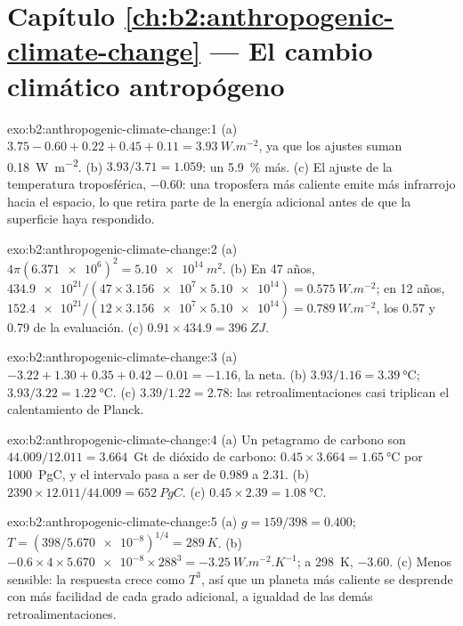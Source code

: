 \section*{Capítulo \ref{ch:b2:anthropogenic-climate-change} --- El cambio climático antropógeno}

\begin{solution}{exo:b2:anthropogenic-climate-change:1}
(a) $3.75 - 0.60 + 0.22 + 0.45 + 0.11 = \qty{3.93}{W.m^{-2}}$, ya que los ajustes suman
\qty{0.18}{W.m^{-2}}. (b) $3.93/3.71 = 1.059$: un \qty{5.9}{\percent} más. (c) El ajuste de la temperatura
troposférica, $-0.60$: una troposfera más caliente emite más infrarrojo hacia el espacio, lo que retira
parte de la energía adicional antes de que la superficie haya respondido.
\end{solution}

\begin{solution}{exo:b2:anthropogenic-climate-change:2}
(a) $4\pi(\num{6.371e6})^2 = \qty{5.10e14}{m^2}$. (b) En 47 años, $\num{434.9e21}/(47 \times
\num{3.156e7} \times \num{5.10e14}) = \qty{0.575}{W.m^{-2}}$; en 12 años, $\num{152.4e21}/(12
\times \num{3.156e7} \times \num{5.10e14}) = \qty{0.789}{W.m^{-2}}$, los 0.57 y 0.79 de la
evaluación. (c) $0.91 \times 434.9 = \qty{396}{ZJ}$.
\end{solution}

\begin{solution}{exo:b2:anthropogenic-climate-change:3}
(a) $-3.22 + 1.30 + 0.35 + 0.42 - 0.01 = \num{-1.16}$, la neta. (b) $3.93/1.16 =
\qty{3.39}{\celsius}$; $3.93/3.22 = \qty{1.22}{\celsius}$. (c) $3.39/1.22 = 2.78$: las retroalimentaciones
casi triplican el calentamiento de Planck.
\end{solution}

\begin{solution}{exo:b2:anthropogenic-climate-change:4}
(a) Un petagramo de carbono son $44.009/12.011 = 3.664$~Gt de dióxido de carbono: $0.45 \times 3.664 =
\qty{1.65}{\celsius}$ por \qty{1000}{PgC}, y el intervalo pasa a ser de 0.989 a 2.31. (b) $2390 \times
12.011/44.009 = \qty{652}{PgC}$. (c) $0.45 \times 2.39 = \qty{1.08}{\celsius}$.
\end{solution}

\begin{solution}{exo:b2:anthropogenic-climate-change:5}
(a) $g = 159/398 = 0.400$; $T = (398/\num{5.670e-8})^{1/4} = \qty{289}{K}$. (b) $-0.6 \times 4
\times \num{5.670e-8} \times 288^3 = \qty{-3.25}{W.m^{-2}.K^{-1}}$; a \qty{298}{K}, $-3.60$.
(c) Menos sensible: la respuesta crece como $T^3$, así que un planeta más caliente se desprende con más facilidad de cada grado
adicional, a igualdad de las demás retroalimentaciones.
\end{solution}

